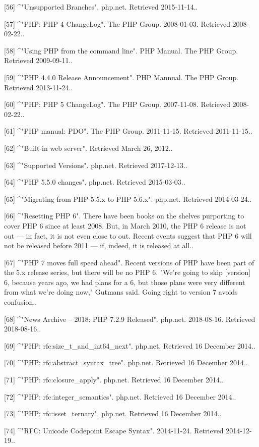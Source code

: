 [56]
^"Unsupported Branches". php.net. Retrieved 2015-11-14..

[57]
^"PHP: PHP 4 ChangeLog". The PHP Group. 2008-01-03. Retrieved 2008-02-22..

[58]
^"Using PHP from the command line". PHP Manual. The PHP Group. Retrieved 2009-09-11..

[59]
^"PHP 4.4.0 Release Announcement". PHP Mannual. The PHP Group. Retrieved 2013-11-24..

[60]
^"PHP: PHP 5 ChangeLog". The PHP Group. 2007-11-08. Retrieved 2008-02-22..

[61]
^"PHP manual: PDO". The PHP Group. 2011-11-15. Retrieved 2011-11-15..

[62]
^"Built-in web server". Retrieved March 26, 2012..

[63]
^"Supported Versions". php.net. Retrieved 2017-12-13..

[64]
^"PHP 5.5.0 changes". php.net. Retrieved 2015-03-03..

[65]
^"Migrating from PHP 5.5.x to PHP 5.6.x". php.net. Retrieved 2014-03-24..

[66]
^"Resetting PHP 6". There have been books on the shelves purporting to cover PHP 6 since at least 2008. But, in March 2010, the PHP 6 release is not out — in fact, it is not even close to out. Recent events suggest that PHP 6 will not be released before 2011 — if, indeed, it is released at all..

[67]
^"PHP 7 moves full speed ahead". Recent versions of PHP have been part of the 5.x release series, but there will be no PHP 6. "We're going to skip [version] 6, because years ago, we had plans for a 6, but those plans were very different from what we're doing now," Gutmans said. Going right to version 7 avoids confusion..

[68]
^"News Archive – 2018: PHP 7.2.9 Released". php.net. 2018-08-16. Retrieved 2018-08-16..

[69]
^"PHP: rfc:size_t_and_int64_next". php.net. Retrieved 16 December 2014..

[70]
^"PHP: rfc:abstract_syntax_tree". php.net. Retrieved 16 December 2014..

[71]
^"PHP: rfc:closure_apply". php.net. Retrieved 16 December 2014..

[72]
^"PHP: rfc:integer_semantics". php.net. Retrieved 16 December 2014..

[73]
^"PHP: rfc:isset_ternary". php.net. Retrieved 16 December 2014..

[74]
^"RFC: Unicode Codepoint Escape Syntax". 2014-11-24. Retrieved 2014-12-19..

